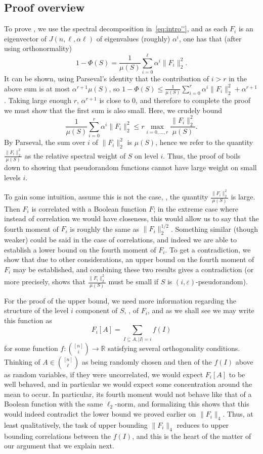 \documentclass{toc}
\newcommand\card[1]{\left| {#1} \right|}
\newcommand\norm[1]{\| #1 \|}
\newcommand\eps{\varepsilon}
\renewcommand\leq{\leqslant}
\begin{document}
\subsection{Proof overview}
To prove , we use the spectral decomposition
in~\eqref{eq:intro''}, and as each $F_{i}$ is an eigenvector of $J(n,\ell,\alpha\ell)$
of eigenvalues (roughly) $\alpha^i$, one has that (after using orthonormality)
\[
1-\Phi(S) = \frac{1}{\mu(S)}\sum\limits_{i=0}^{\ell} \alpha^i\norm{F_{i}}_2^2.
\]
It can be shown, using Parseval's identity that the contribution of $i>r$ in the above sum is at most $\alpha^{r+1} \mu(S)$,
so $1-\Phi(S) \leq \frac{1}{\mu(S)}\sum\limits_{i=0}^{r} \alpha^i\norm{F_{i}}_2^2 + \alpha^{r+1}$. Taking large enough $r$,
$\alpha^{r+1}$ is close to $0$, and therefore to complete the proof we must show that the first sum is also small. Here,
we crudely bound
\[
\frac{1}{\mu(S)}\sum\limits_{i=0}^{r} \alpha^i\norm{F_{i}}_2^2
\leq r\max_{i=0,\ldots,r}\frac{\norm{F_{i}}_2^2}{\mu(S)}.
\]
By Parseval, the sum over $i$ of $\norm{F_{i}}_2^2$ is $\mu(S)$, hence we refer to the quantity $\frac{\norm{F_{i}}_2^2}{\mu(S)}$
as the relative spectral weight of $S$ on level $i$. Thus, the proof of  boils down to showing that pseudorandom
functions cannot have large weight on small levels $i$.

To gain some intuition, assume this is not the case, %
\ie, the quantity $\frac{\norm{F_{i}}_2^2}{\mu(S)}$
is large. Then $F_{i}$ is correlated with a Boolean function $F$; in the extreme case where instead of correlation we would have closeness, this would allow
us to say that the fourth moment of $F_i$ is roughly the same as $\norm{F_i}_2^{1/2}$. Something similar (though weaker) could be said in the case of correlations,
and indeed we are able to establish a lower bound on the fourth moment of $F_i$. To get a contradiction, we show that due to other considerations, an upper bound
on the fourth moment of $F_i$ may be established, and combining these two results gives a contradiction (or more precisely, shows that $\frac{\norm{F_{i}}_2^2}{\mu(S)}$
must be small if $S$ is $(i,\eps)$-pseudorandom).

For the proof of the upper bound, we need more information regarding the structure of the level $i$
component of $S$, \ie, of $F_{i}$, and as we shall see we may write this function as
\[
F_i[A] = \sum\limits_{I\subseteq A, \card{I} = i}f(I)
\]
for some function $f\colon \binom{[n]}{i}\to\mathbb{R}$ satisfying several orthogonality conditions. Thinking of $A\in\binom{[n]}{\ell}$ as being randomly chosen and %
then of the %
%
$f(I)$   %
above as random variables, if they were uncorrelated, we would expect $F_i[A]$ to be well behaved, and in particular we would
expect some concentration around the mean to occur. In particular, its fourth moment would not behave like that of a Boolean function with the same $\ell_2$-norm,
and formalizing this shows that this would indeed contradict the lower bound we proved earlier on $\norm{F_i}_4$. Thus, at least qualitatively, the
task of upper bounding $\norm{F_i}_4$ reduces to upper bounding correlations between
the %
$f(I)$,  %
and this is the heart of the matter of our argument that we explain next.
\end{document}
